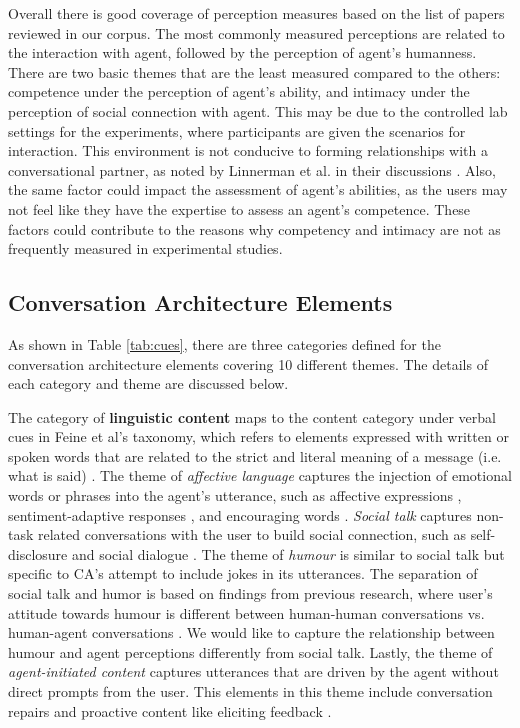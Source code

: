 \documentclass[sigconf,screen,review, anonymous]{acmart}
\newcommand{\cmt}[1]{}%
\begin{document}
Overall there is good coverage of perception measures based on the list of papers reviewed in our corpus. The most commonly measured perceptions are related to the interaction with agent, followed by the perception of agent's humanness. There are two basic themes that are the least measured compared to the others: competence under the perception of agent's ability, and intimacy under the perception of social connection with agent. This may be due to the controlled lab settings for the experiments, where participants are given the scenarios for interaction. This environment is not conducive to forming relationships with a conversational partner, as noted by Linnerman et al. in their discussions \cite{linnemann2018can}\cmt{[15]}. Also, the same factor could impact the assessment of agent's abilities, as the users may not feel like they have the expertise to assess an agent's competence. These factors could contribute to the reasons why competency and intimacy are not as frequently measured in experimental studies.


\subsection{Conversation Architecture Elements}

As shown in Table \ref{tab:cues}, there are three categories defined for the conversation architecture elements covering 10 different themes. The details of each category and theme are discussed below.

The category of \textbf{linguistic content} maps to the content category under verbal cues in Feine et al's taxonomy, which refers to elements expressed with written or spoken words that are related to the strict and literal meaning of a message (i.e. what is said) \cite{feine2019taxonomy}. The theme of \textit{affective language} captures the injection of emotional words or phrases into the agent's utterance, such as affective expressions \cite{seeger2021chatbots}\cmt{[35]}\cite{yang2017perceived}\cmt{[44]}\cite{zhu2022effects}\cmt{[26]}, sentiment-adaptive responses \cite{diederich2019emulating}\cmt{[25]}, and encouraging words \cite{healey2013relating}\cmt{[39]}. \textit{Social talk} captures non-task related conversations with the user to build social connection, such as self-disclosure \cite{lee2020hear}\cmt{[23]} and social dialogue \cite{volkel2021manipulating}\cmt{[68]}\cite{lubold2016effects}\cmt{[86]}. The theme of \textit{humour} is similar to social talk but specific to CA's attempt to include jokes in its utterances. The separation of social talk and humor is based on findings from previous research, where user's attitude towards humour is different between human-human conversations vs. human-agent conversations \cite{clark2019makes}. We would like to capture the relationship between humour and agent perceptions differently from social talk. Lastly, the theme of \textit{agent-initiated content} captures utterances that are driven by the agent without direct prompts from the user. This elements in this theme include conversation repairs \cite{cuadra2021my}\cmt{[67]}\cite{ashktorab2019resilient}\cmt{[88]} and proactive content like eliciting feedback \cite{xiao2021let}\cmt{[73]}.
\end{document}
